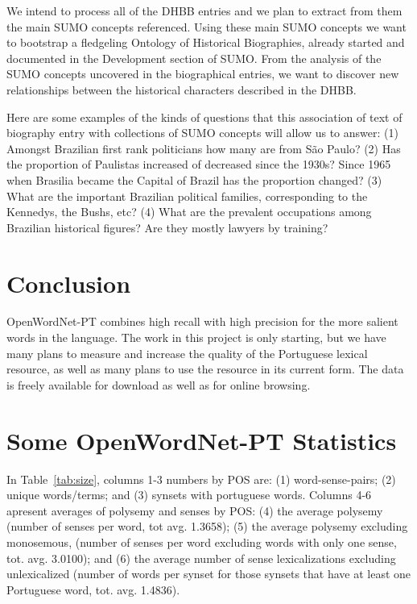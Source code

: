 \documentclass[a4paper,twocolumn]{article}
\begin{document}
We intend to process all of the DHBB entries and we plan to extract from
them the main SUMO concepts referenced. Using these main SUMO concepts
we want to bootstrap a fledgeling Ontology of Historical Biographies,
already started and documented in the Development section of
SUMO. From the analysis of the SUMO concepts uncovered in the
biographical entries, we want to discover new relationships between
the historical characters described in the DHBB.

Here are some examples of the kinds of questions that this association
of text of biography entry with collections of SUMO concepts will
allow us to answer: 
(1) Amongst Brazilian first rank politicians how many are from S\~ao
Paulo?
(2) Has the proportion of Paulistas increased of decreased since the
1930s? Since 1965 when Brasilia became the Capital of Brazil has the
proportion changed?
(3) What are the important Brazilian political families, corresponding
to the Kennedys, the Bushs, etc?
(4) What are the prevalent occupations among Brazilian historical
figures? Are they mostly lawyers by training?

\section{Conclusion} 

OpenWordNet-PT combines high recall with high precision for the more
salient words in the language. The work in this project is only
starting, but we have many plans to measure and increase the quality
of the Portuguese lexical resource, as well as many plans to use the
resource in its current form. The data is freely available for
download as well as for online browsing.




\appendix 

\section{Some OpenWordNet-PT Statistics}

In Table~\ref{tab:size}, columns 1-3 numbers by POS are: (1)
word-sense-pairs; (2) unique words/terms; and (3) synsets with
portuguese words. Columns 4-6 apresent averages of polysemy and senses
by POS: (4) the average polysemy (number of senses per word, tot
avg. 1.3658); (5) the average polysemy excluding monosemous, (number
of senses per word excluding words with only one sense,
tot. avg. 3.0100); and (6) the average number of sense lexicalizations
excluding unlexicalized (number of words per synset for those synsets
that have at least one Portuguese word, tot. avg. 1.4836).
\end{document}
